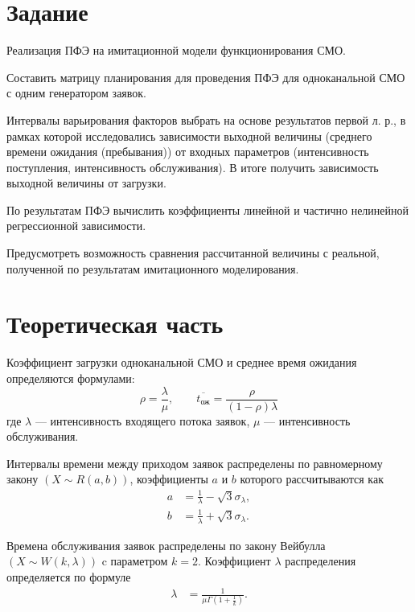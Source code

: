\documentclass[a4paper, 14pt]{extreport}
\begin{document}


\begin{MainPart}

\section{Задание}

Реализация ПФЭ на имитационной модели функционирования СМО.

Составить матрицу планирования для проведения ПФЭ для одноканальной СМО с одним генератором заявок.

Интервалы варьирования факторов выбрать на основе результатов первой л. р., в рамках которой исследовались зависимости выходной величины (среднего времени ожидания (пребывания)) от входных параметров (интенсивность поступления, интенсивность обслуживания).
В итоге получить зависимость выходной величины от загрузки.

По результатам ПФЭ вычислить коэффициенты линейной и частично нелинейной регрессионной зависимости.

Предусмотреть возможность сравнения рассчитанной величины с реальной, полученной по результатам имитационного моделирования.

\section{Теоретическая часть}

Коэффициент загрузки одноканальной СМО и среднее время ожидания определяются формулами:
\begin{equation}
	\label{eqn:load-and-wait}
	\rho = \frac\lambda\mu, \qquad \overline{t_{\text{ож}}} = \frac{\rho}{(1 - \rho)\lambda}
\end{equation}
где $\lambda$ — интенсивность входящего потока заявок, $\mu$ — интенсивность обслуживания.

Интервалы времени между приходом заявок распределены по равномерному закону $(X \sim R(a, b))$, коэффициенты $a$ и $b$ которого рассчитываются как
\begin{equation}
	\begin{aligned}
		a &= \frac1\lambda - \sqrt{3}\sigma_\lambda, \\
		b &= \frac1\lambda + \sqrt{3}\sigma_\lambda.
	\end{aligned}
\end{equation}

Времена обслуживания заявок распределены по закону Вейбулла $(X \sim W(k, \lambda))$ c параметром $k = 2$.
Коэффициент $\lambda$ распределения определяется по формуле
\begin{equation}
	\begin{aligned}
		\lambda &= \frac{1}{\mu\Gamma{\left(1 + \frac1k\right)}}.
	\end{aligned}
\end{equation}


\end{MainPart}
\end{document}
